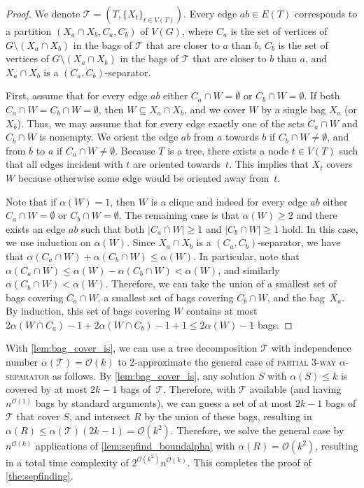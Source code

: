 \documentclass[11pt]{article}
\theoremstyle{definition}
\newcommand{\td}{\mathcal{T}}
\newcommand{\OO}{\mathcal{O}}
\begin{document}
\begin{proof}
We denote $\td = (T, \{X_t\}_{t \in V(T)})$.
Every edge $ab \in E(T)$ corresponds to a partition $(X_a \cap X_b, C_a, C_b)$ of $V(G)$, where $C_a$ is the set of vertices of $G \setminus (X_a \cap X_b)$ in the bags of $\td$ that are closer to $a$ than $b$, $C_b$ is the set of vertices of $G \setminus (X_a \cap X_b)$ in the bags of $\td$ that are closer to $b$ than $a$, and $X_a \cap X_b$ is a $(C_a, C_b)$-separator.


First, assume that for every edge $ab$ either $C_a \cap W = \emptyset$ or $C_b \cap W = \emptyset$.
If both $C_a \cap W =C_b \cap W = \emptyset$, then $W\subseteq X_a\cap X_b$, and we cover $W$ by a single bag $X_a$ (or $X_b$).
Thus, we may assume that for every edge exactly one of the sets  $C_a \cap W$ and $C_b \cap W$  is nonempty.
We orient the edge $ab$ from $a$ towards $b$ if $C_b \cap W \neq \emptyset$, and from $b$ to $a$ if $C_a \cap W \neq \emptyset$.
Because $T$ is a tree, there exists a node $t \in V(T)$ such that all edges incident with $t$ are oriented towards~$t$.
This implies that $X_t$ covers $W$ because otherwise some edge would be oriented away from~$t$.


Note that if $\alpha(W) = 1$, then $W$ is a clique and indeed for every edge $ab$  either $C_a \cap W = \emptyset$ or $C_b \cap W = \emptyset$.
The remaining case is that $\alpha(W) \ge 2$ and there exists an edge $ab$ such that both $|C_a \cap W| \ge 1$ and $|C_b \cap W| \ge 1$ hold.
In this case, we use induction on $\alpha(W)$.
Since $X_a \cap X_b$ is a $(C_a, C_b)$-separator, we have that $\alpha(C_a \cap W) + \alpha(C_b \cap W) \le \alpha(W)$.
In particular, note that $\alpha(C_a \cap W) \leq \alpha(W) - \alpha(C_b \cap W) < \alpha(W)$, and similarly $\alpha(C_b \cap W) < \alpha(W)$.
Therefore, we can take the union of a smallest set of bags covering $C_a \cap W$, a smallest set of bags covering $C_b \cap W$, and the bag~$X_a$. 
By induction, this set of bags covering $W$ contains at most $2\alpha(W \cap C_a)-1 + 2\alpha(W \cap C_b)-1 + 1 \le 2\alpha(W)-1$ bags.
\end{proof}


With \cref{lem:bag_cover_is}, we can use a tree decomposition $\td$ with independence number $\alpha(\td) = \OO(k)$ to 2-approximate the general case of \textsc{partial 3-way $\alpha$-separator} as follows.
By \cref{lem:bag_cover_is}, any solution $S$ with $\alpha(S) \le k$ is covered by at most $2k-1$ bags of~$\td$.
Therefore, with $\td$ available (and having $n^{\OO(1)}$ bags by standard arguments), we can guess a set of at most $2k-1$ bags of $\td$ that cover $S$, and intersect $R$ by the union of these bags, resulting in $\alpha(R) \le \alpha(\td) (2k-1) = \OO(k^2)$.
Therefore, we solve the general case by $n^{\OO(k)}$ applications of \cref{lem:sepfind_boundalpha} with $\alpha(R) = \OO(k^2)$, resulting in a total time complexity of $2^{\OO(k^2)} n^{\OO(k)}$.
This completes the proof of \cref{the:sepfinding}.
\end{document}
